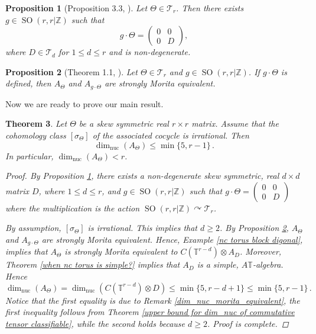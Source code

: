 \documentclass{amsart}
\newtheorem{theorem}{Theorem}[section]
\newtheorem{proposition}[theorem]{Proposition}
\theoremstyle{definition}
\newcommand{\Z}{\mathbb{Z}}
\newcommand{\TT}{\mathbb{T}}
\DeclareMathOperator{\nuc}{nuc}
\DeclareMathOperator{\SO}{SO}
\newcommand{\dimnuc}{\dim_{\nuc}}
\begin{document}
\begin{proposition}[Proposition 3.3, \cite{elliott2006moritaequivalencesmoothnoncommutative}]\label{equivalent to nice matrix}
Let $\Theta\in \mathcal{T}_r$. Then there exists $g\in \SO(r,r|\Z)$ such that $$g\cdot \Theta=\begin{pmatrix}
            0&0\\0&D
        \end{pmatrix},$$
        where $D\in \mathcal{T}_d$ for $1\leq d \leq r$ and is non-degenerate.
    
\end{proposition}
\begin{proposition}[Theorem 1.1, \cite{Morita_equivalence_nc_tori}]\label{criterion_for_morita_equivalence}
Let $\Theta\in \mathcal{T}_r$ and $g\in \SO(r,r|\Z)$. If $g\cdot \Theta$ is defined, then $A_{\Theta}$ and $A_{g\cdot \Theta}$ are strongly Morita equivalent. 
\end{proposition}
Now we are ready to prove our main result.
\begin{theorem}\label{irrational case on Z^r}
    Let $\Theta$ be a skew symmetric real $r\times r$ matrix. Assume that the cohomology class $[\sigma_{\Theta}]$  of the associated cocycle is irrational. Then $$\dimnuc(A_{\Theta})\leq \min\{5,r-1\}\,.$$
    In particular, $\dimnuc(A_{\Theta})<r$.
    \begin{proof}
        By Proposition \ref{equivalent to nice matrix}, there exists a non-degenerate skew symmetric, real $d\times d$ matrix $D$, where $1\leq d\leq r$, and $g\in \SO(r,r|\Z)$ such that
        $g\cdot \Theta=\begin{pmatrix}
            0&0\\0&D
        \end{pmatrix}$
        where the multiplication is the action $\SO(r,r|\Z)\curvearrowright \mathcal{T}_r$. \par
        By assumption, $[\sigma_{\Theta}]$ is irrational. This implies that $d\geq 2$.
        By Proposition \ref{criterion_for_morita_equivalence}, $A_{\Theta}$ and $A_{g\cdot \Theta}$ are strongly Morita equivalent. Hence, Example \ref{nc torus block digonal}, implies that
        $A_{\Theta}$ is strongly Morita equivalent to $C(\TT^{r-d})\otimes A_D$. Moreover, Theorem \ref{when nc torus is simple?} implies that $A_D$ is a simple, $A\TT$-algebra. Hence
        $$\dimnuc(A_{\Theta})=\dimnuc(C(\TT^{r-d})\otimes D)\leq \min\{5,r-d+1\}\leq \min\{5,r-1\}\,.$$
        Notice that the first equality is due to Remark \ref{dim_nuc_morita_equivalent}, the first inequality follows from Theorem \ref{upper bound for dim_nuc of commutative tensor classifiable}, while the second holds because $d\geq 2$. Proof is complete.
    \end{proof}
\end{theorem}
\end{document}
